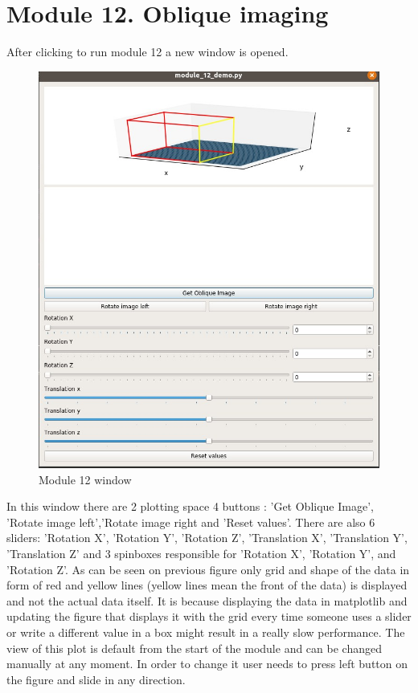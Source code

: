 \section{Module 12. Oblique imaging}

\indent After clicking to run module 12 a new window is opened.

\begin{figure}[H]
\centering{}\includegraphics[scale=0.6]{figures/module_12/mod12window}\caption{Module 12 window\label{fig:figure/module_12/Preprocessing}}
\end{figure}

\indent In this window there are 2 plotting space 4 buttons : 'Get Oblique Image', 'Rotate image left','Rotate image right and 'Reset values'. There are also 6 sliders: 'Rotation X', 'Rotation Y', 'Rotation Z', 'Translation X', 'Translation Y', 'Translation Z' and 3 spinboxes responsible for 'Rotation X', 'Rotation Y', and 'Rotation Z'.
\newline\indent As can be seen on previous figure only grid and shape of the data in form of red and yellow lines (yellow lines mean the front of the data) is displayed and not the actual data itself. It is because displaying the data in matplotlib and updating the figure that displays it with the grid every time someone uses a slider or write a different value in a box might result in a really slow performance.
\newline\indent The view of this plot is default from the start of the module and can be changed manually at any moment. In order to change it user needs to press left button on the figure and slide in any direction.

